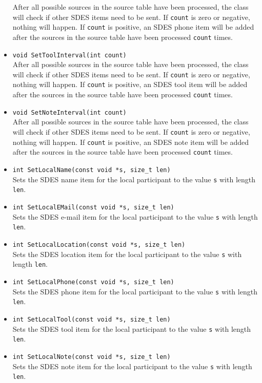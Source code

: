 \documentclass[12pt,a4paper]{article}
\begin{document}
\begin{itemize}
						After all possible sources in the source table have been
						processed, the class will check if other SDES items
						need to be sent. If {\tt count} is zero or negative, nothing
						will happen. If {\tt count} is positive, an SDES phone
						item will be added after the sources in the source table have
						been processed {\tt count} times.
					\item {\tt void SetToolInterval(int count)}\\
						After all possible sources in the source table have been
						processed, the class will check if other SDES items
						need to be sent. If {\tt count} is zero or negative, nothing
						will happen. If {\tt count} is positive, an SDES tool
						item will be added after the sources in the source table have
						been processed {\tt count} times.
					\item {\tt void SetNoteInterval(int count)}\\
						After all possible sources in the source table have been
						processed, the class will check if other SDES items
						need to be sent. If {\tt count} is zero or negative, nothing
						will happen. If {\tt count} is positive, an SDES note
						item will be added after the sources in the source table have
						been processed {\tt count} times.
					\item {\tt int SetLocalName(const void *s, size\_t len)}\\
						Sets the SDES name item for the local participant to the value {\tt s}
						with length {\tt len}.
					\item {\tt int SetLocalEMail(const void *s, size\_t len)}\\
						Sets the SDES e-mail item for the local participant to the value {\tt s}
						with length {\tt len}.
					\item {\tt int SetLocalLocation(const void *s, size\_t len)}\\
						Sets the SDES location item for the local participant to the value {\tt s}
						with length {\tt len}.
					\item {\tt int SetLocalPhone(const void *s, size\_t len)}\\
						Sets the SDES phone item for the local participant to the value {\tt s}
						with length {\tt len}.
					\item {\tt int SetLocalTool(const void *s, size\_t len)}\\
						Sets the SDES tool item for the local participant to the value {\tt s}
						with length {\tt len}.
					\item {\tt int SetLocalNote(const void *s, size\_t len)}\\
						Sets the SDES note item for the local participant to the value {\tt s}
						with length {\tt len}.
				\end{itemize}
				
\end{document}
